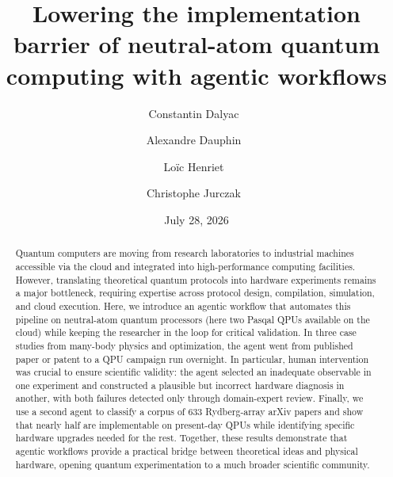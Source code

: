 \documentclass[aps,pra,reprint,amssymb,superscriptaddress,nofootinbib,floatfix]{revtex4-2}
\begin{document}
\title{Lowering the implementation barrier of neutral-atom quantum computing with agentic workflows}

\author{Constantin Dalyac~}
\author{Alexandre Dauphin~}
\author{Loïc Henriet~}

\author{Christophe Jurczak~}

\date{July 28, 2026}
\begin{abstract}
    Quantum computers are moving from research laboratories to industrial machines accessible via the cloud and integrated into high-performance computing facilities. However, translating theoretical quantum protocols into hardware experiments remains a major bottleneck, requiring expertise across protocol design, compilation, simulation, and cloud execution. Here, we introduce an agentic workflow that automates this pipeline on neutral-atom quantum processors (here two Pasqal QPUs available on the cloud) while keeping the researcher in the loop for critical validation. In three case studies from many-body physics and optimization, the agent went from published paper or patent to a QPU campaign run overnight. In particular, human intervention was crucial to ensure scientific validity: the agent selected an inadequate observable in one experiment and constructed a plausible but incorrect hardware diagnosis in another, with both failures detected only through domain-expert review. Finally, we use a second agent to classify a corpus of 633 Rydberg-array arXiv papers and show that nearly half are implementable on present-day QPUs while identifying specific hardware upgrades needed for the rest. Together, these results demonstrate that agentic workflows provide a practical bridge between theoretical ideas and physical hardware, opening quantum experimentation to a much broader scientific community.
\end{abstract}


\maketitle
\end{document}
